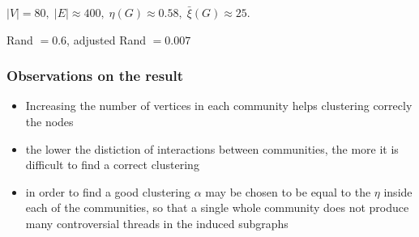 \documentclass{beamer}
\begin{document}
\begin{frame}[c]
	$|V| = 80, \; |E| \approx 400, \; \eta(G) \approx 0.58, \; \bar{\xi}(G)
		\approx 25$.

	Rand $= 0.6$, adjusted Rand $= 0.007$
\end{frame}

\begin{frame}[c]
	\frametitle{Observations on the result}
	\begin{itemize}
		\item Increasing the number of vertices in each community helps
		      clustering correcly the nodes
		\item the lower the distiction of interactions between communities,
		      the more it is difficult to find a correct clustering
		\item in order to find a good clustering $\alpha $ may be chosen to
		      be equal to the $\eta$ inside each of the communities, so that a
		      single whole community does not produce many controversial
		      threads in the induced subgraphs
	\end{itemize}
\end{frame}
\end{document}
